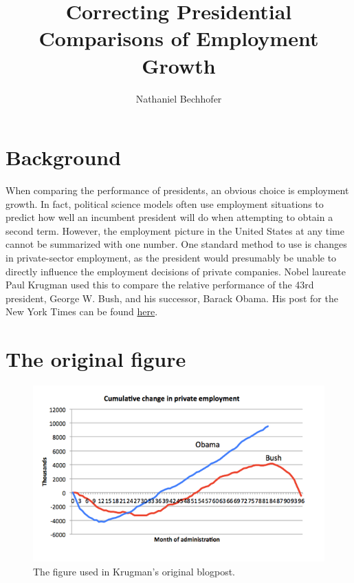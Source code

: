 \documentclass[12pt]{amsart}
\title{Correcting Presidential Comparisons of Employment Growth}
\author{Nathaniel Bechhofer}
\begin{document}
\maketitle

\section*{Background}
When comparing the performance of presidents, an obvious choice is employment growth. In fact, political science models often use employment situations to predict how well an incumbent president will do when attempting to obtain a second term. However, the employment picture in the United States at any time cannot be summarized with one number. One standard method to use is changes in private-sector employment, as the president would presumably be unable to directly influence the employment decisions of private companies. Nobel laureate Paul Krugman used this to compare the relative performance of the 43rd president, George W. Bush, and his successor, Barack Obama. His post for the New York Times can be found \href{http://krugman.blogs.nytimes.com/2015/12/27/obama-the-job-killer/}{here}.

\section*{The original figure}

\begin{figure}[!htbp]
\begin{center}
\includegraphics[width=\textwidth]{Original.png}
\caption{The figure used in Krugman's original blogpost.}
\label{orig}
\end{center}
\end{figure}
\end{document}
